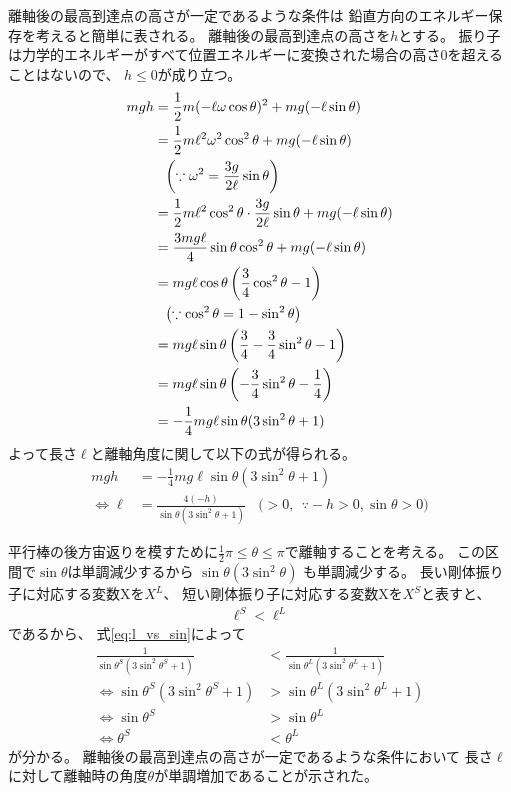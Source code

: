 \documentclass[a4paper,11pt]{jsarticle}
\begin{document}
離軸後の最高到達点の高さが一定であるような条件は
鉛直方向のエネルギー保存を考えると簡単に表される。
離軸後の最高到達点の高さを$h$とする。
振り子は力学的エネルギーがすべて位置エネルギーに変換された場合の高さ$0$を超えることはないので、
$h\leq0$が成り立つ。
\begin{align}
  mgh 
  &= \frac{1}{2}m (-\ell \omega \cos \theta)^2 + mg (-\ell \sin \theta)
  \label{eq:energy_vertical}
  \\
  &= \frac{1}{2}m\ell^2 \omega^2 \cos^2 \theta + mg (-\ell \sin \theta)
  \notag
  \\
  & \ \ \left( \because \omega^2 = \frac{3g}{2\ell}\sin\theta \right) \notag
  \\
  &= \frac{1}{2}m\ell^2 \cos^2 \theta \cdot \frac{3g}{2\ell}\sin\theta + mg (-\ell \sin \theta)
  \notag
  \\
  &= \frac{3mg\ell}{4}\sin\theta \cos^2\theta + mg (-\ell\sin\theta)
  \notag
  \\
  &= mg\ell\cos\theta \left( \frac{3}{4}\cos^2\theta - 1\right)
  \notag
  \\
  & \ \ \left( \because \cos^2\theta = 1 - \sin^2\theta \right)
  \notag
  \\
  &= mg\ell\sin\theta \left( \frac{3}{4} - \frac{3}{4}\sin^2\theta - 1 \right)
  \notag
  \\
  &= mg\ell\sin\theta \left( - \frac{3}{4}\sin^2\theta - \frac{1}{4} \right)
  \notag
  \\
  &= -\frac{1}{4}mg\ell\sin\theta (3\sin^2\theta + 1)
  \notag
\end{align}
よって長さ$\ell$と離軸角度に関して以下の式が得られる。
\begin{align}
  mgh &= -\frac{1}{4}mg\ell \sin\theta (3\sin^2\theta + 1)
  \label{eq:energy_vertical:conclusion}
  \\
  \Leftrightarrow
  \ell &= \frac{4(-h)}{\sin\theta (3\sin^2\theta + 1)} \ \ \ \ \Big( > 0, \ \ \because -h > 0, \sin\theta > 0 \Big)
  \label{eq:l_vs_sin}
\end{align}

平行棒の後方宙返りを模すために$\frac{1}{2}\pi \leq \theta \leq \pi$で離軸することを考える。
この区間で$\sin\theta$は単調減少するから
$\sin\theta (3\sin^2\theta)$ も単調減少する。
長い剛体振り子に対応する変数Xを$X^L$、
短い剛体振り子に対応する変数Xを$X^S$と表すと、
\begin{align*}
  \ell^S < \ell^L
\end{align*}
であるから、
式\ref{eq:l_vs_sin}によって
\begin{align*}
  \frac{1}{\sin\theta^S (3\sin^2\theta^S + 1)} &< \frac{1}{\sin\theta^L (3\sin^2\theta^L + 1)}
  \\
  \Leftrightarrow
  \sin\theta^S (3\sin^2\theta^S + 1) &> \sin\theta^L (3\sin^2\theta^L + 1)
  \\
  \Leftrightarrow
  \sin\theta^S &> \sin\theta^L
  \\
  \Leftrightarrow
  \theta^S &< \theta^L
\end{align*}
が分かる。
離軸後の最高到達点の高さが一定であるような条件において
長さ$\ell$に対して離軸時の角度$\theta$が単調増加であることが示された。
\end{document}
